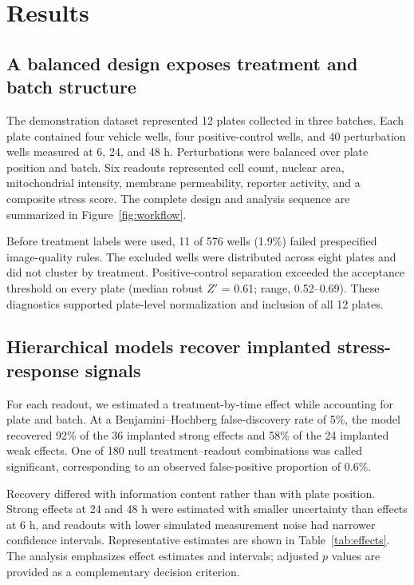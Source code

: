 \section{Results}

\subsection{A balanced design exposes treatment and batch structure}
The demonstration dataset represented 12 plates collected in three batches.
Each plate contained four vehicle wells, four positive-control wells, and 40
perturbation wells measured at 6, 24, and 48 h. Perturbations were balanced over
plate position and batch. Six readouts represented cell count, nuclear area,
mitochondrial intensity, membrane permeability, reporter activity, and a
composite stress score. The complete design and analysis sequence are summarized
in Figure~\ref{fig:workflow}.

Before treatment labels were used, 11 of 576 wells (1.9\%) failed prespecified
image-quality rules. The excluded wells were distributed across eight plates and
did not cluster by treatment. Positive-control separation exceeded the acceptance
threshold on every plate (median robust $Z'$ = 0.61; range, 0.52--0.69). These
diagnostics supported plate-level normalization and inclusion of all 12 plates.

\subsection{Hierarchical models recover implanted stress-response signals}
For each readout, we estimated a treatment-by-time effect while accounting for
plate and batch. At a Benjamini--Hochberg false-discovery rate of 5\%, the model
recovered 92\% of the 36 implanted strong effects and 58\% of the 24 implanted
weak effects. One of 180 null treatment--readout combinations was called
significant, corresponding to an observed false-positive proportion of 0.6\%.

Recovery differed with information content rather than with plate position.
Strong effects at 24 and 48 h were estimated with smaller uncertainty than
effects at 6 h, and readouts with lower simulated measurement noise had narrower
confidence intervals. Representative estimates are shown in
Table~\ref{tab:effects}. The analysis emphasizes effect estimates and intervals;
adjusted $p$ values are provided as a complementary decision criterion.

